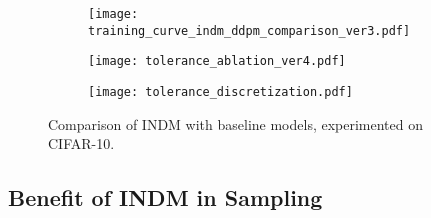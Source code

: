 \documentclass{article}
\theoremstyle{definition}
\theoremstyle{remark}
\begin{document}
	\begin{figure*}[t]
		\centering
		\vskip -0.05in
		\begin{subfigure}{0.32\linewidth}
			\centering
			\texttt{[image: training\_curve\_indm\_ddpm\_comparison\_ver3.pdf]}
			\vskip -0.05in
		\end{subfigure}
		\hfill
		\begin{subfigure}{0.32\linewidth}
			\centering
			\texttt{[image: tolerance\_ablation\_ver4.pdf]}
			\vskip -0.05in
		\end{subfigure}
		\hfill
		\begin{subfigure}{0.32\linewidth}
			\centering
			\texttt{[image: tolerance\_discretization.pdf]}
			\vskip -0.05in
		\end{subfigure}
		\vskip -0.05in
		\caption{Comparison of INDM with baseline models, experimented on CIFAR-10.}
		\label{fig:discussion}
		\vskip -0.1in
	\end{figure*}
	
	\subsection{Benefit of INDM in Sampling}\label{sec:sampling_robustness}
	
\end{document}
